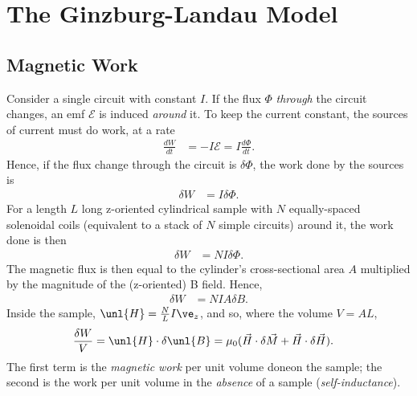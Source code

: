 \documentclass[qo.tex]{subfiles}
\begin{document}
\chapter{The Ginzburg-Landau Model}
\section{Magnetic Work}
Consider a single circuit with constant $I$.
If the flux $\Phi$ \emph{through} the circuit changes, an emf $\mathcal{E}$ is induced \emph{around} it. 
To keep the current constant, the sources of current must do work, at a rate 
\begin{align}
    \frac{dW}{dt} &= -I\mathcal{E} = I\frac{d\Phi}{dt}.
\end{align}
Hence, if the flux change through the circuit is $\delta\Phi$, the work done by the sources is 
\begin{align}
    \delta W &= I\delta\Phi.
\end{align}
For a length $L$ long z-oriented cylindrical sample with $N$ equally-spaced solenoidal coils (equivalent to a stack of $N$ simple circuits) around it, the work done is then
\begin{align}
    \delta W &= NI\delta\Phi.
\end{align}
The magnetic flux is then equal to the cylinder's cross-sectional area $A$ multiplied by the magnitude of the (z-oriented) B field. 
Hence, 
\begin{align}
    \delta W &= NIA\delta B.
\end{align}
Inside the sample, $\unl{H}=\frac{N}{L}I\ve_z$, and so, where the volume $V=AL$,
\begin{align}
    \frac{\delta W}{V} &= \unl{H}\cdot\delta\unl{B} = \mu_0(\vec{H}\cdot\delta\vec{M}+\vec{H}\cdot\delta\vec{H}).
\end{align}
The first term is the \emph{magnetic work} per unit volume doneon the sample; the second is the work per unit volume in the \emph{absence} of a sample (\emph{self-inductance}).
\end{document}
